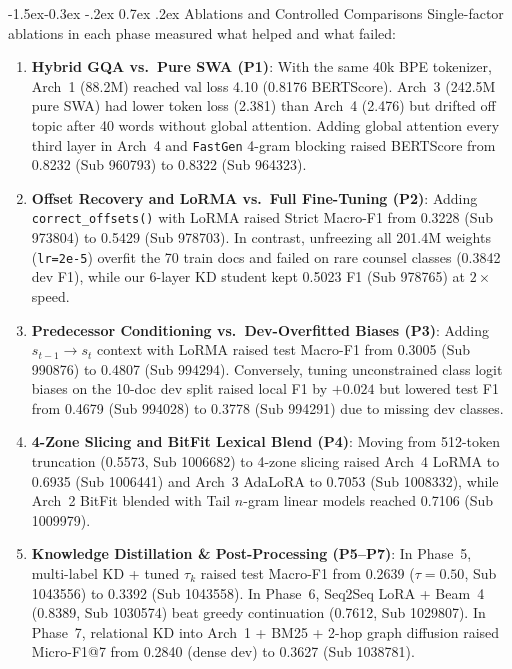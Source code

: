 \documentclass[11pt, oneside]{article}
\makeatletter
\renewcommand\subsection{\@startsection{subsection}{2}{\z@}%
  {-1.5ex\@plus -0.3ex \@minus -.2ex}%
  {0.7ex \@plus .2ex}%
  {\normalfont\large\bfseries}}
\makeatother
\begin{document}
\subsection{Ablations and Controlled Comparisons}
Single-factor ablations in each phase measured what helped and what failed:
\begin{enumerate}[leftmargin=*,nosep]
    \item \textbf{Hybrid GQA vs.\ Pure SWA (P1)}: With the same 40k BPE tokenizer, Arch~1 (88.2M) reached val loss 4.10 (0.8176 BERTScore). Arch~3 (242.5M pure SWA) had lower token loss (2.381) than Arch~4 (2.476) but drifted off topic after 40 words without global attention. Adding global attention every third layer in Arch~4 and \texttt{FastGen} 4-gram blocking raised BERTScore from 0.8232 (Sub 960793) to 0.8322 (Sub 964323).
    \item \textbf{Offset Recovery and LoRMA vs.\ Full Fine-Tuning (P2)}: Adding \texttt{correct\_offsets()} with LoRMA raised Strict Macro-F1 from 0.3228 (Sub 973804) to 0.5429 (Sub 978703). In contrast, unfreezing all 201.4M weights (\texttt{lr=2e-5}) overfit the 70 train docs and failed on rare counsel classes (0.3842 dev F1), while our 6-layer KD student kept 0.5023 F1 (Sub 978765) at $2\times$ speed.
    \item \textbf{Predecessor Conditioning vs.\ Dev-Overfitted Biases (P3)}: Adding $s_{t-1}\to s_t$ context with LoRMA raised test Macro-F1 from 0.3005 (Sub 990876) to 0.4807 (Sub 994294). Conversely, tuning unconstrained class logit biases on the 10-doc dev split raised local F1 by $+0.024$ but lowered test F1 from 0.4679 (Sub 994028) to 0.3778 (Sub 994291) due to missing dev classes.
    \item \textbf{4-Zone Slicing and BitFit Lexical Blend (P4)}: Moving from 512-token truncation (0.5573, Sub 1006682) to 4-zone slicing raised Arch~4 LoRMA to 0.6935 (Sub 1006441) and Arch~3 AdaLoRA to 0.7053 (Sub 1008332), while Arch~2 BitFit blended with Tail $n$-gram linear models reached 0.7106 (Sub 1009979).
    \item \textbf{Knowledge Distillation \& Post-Processing (P5--P7)}: In Phase~5, multi-label KD + tuned $\tau_k$ raised test Macro-F1 from 0.2639 ($\tau=0.50$, Sub 1043556) to 0.3392 (Sub 1043558). In Phase~6, Seq2Seq LoRA + Beam~4 (0.8389, Sub 1030574) beat greedy continuation (0.7612, Sub 1029807). In Phase~7, relational KD into Arch~1 + BM25 + 2-hop graph diffusion raised Micro-F1@7 from 0.2840 (dense dev) to 0.3627 (Sub 1038781).
\end{enumerate}
\end{document}
